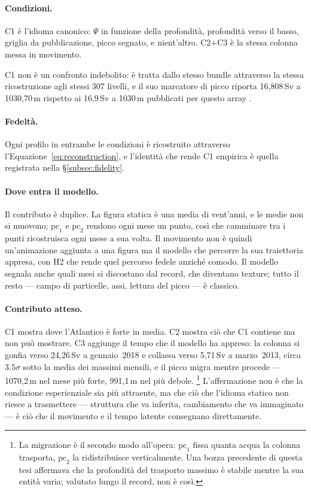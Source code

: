 \paragraph{Condizioni.} C1 è l'idioma canonico: $\Psi$ in funzione della profondità, profondità verso il basso, griglia da pubblicazione, picco segnato, e nient'altro. C2+C3 è la stessa colonna messa in movimento.

C1 non è un confronto indebolito: è tratta dallo stesso bundle attraverso la stessa ricostruzione agli stessi 307 livelli, e il suo marcatore di picco riporta 16,808\,Sv a 1030,70\,m rispetto ai 16,9\,Sv a 1030\,m pubblicati per questo array \parencite{smeed2018}.

\paragraph{Fedeltà.} Ogni profilo in entrambe le condizioni è ricostruito attraverso l'Equazione~\ref{eq:reconstruction}, e l'identità che rende C1 empirica è quella registrata nella \S\ref{subsec:fidelity}.

\paragraph{Dove entra il modello.} Il contributo è duplice. La figura statica è una media di vent'anni, e le medie non si muovono; $\mathrm{pc}_1$ e $\mathrm{pc}_2$ rendono ogni mese un punto, così che camminare tra i punti ricostruisca ogni mese a sua volta. Il movimento non è quindi un'animazione aggiunta a una figura ma il modello che percorre la sua traiettoria appresa, con H2 che rende quel percorso fedele anziché comodo. Il modello segnala anche quali mesi si discostano dal record, che diventano texture; tutto il resto --- campo di particelle, assi, lettura del picco --- è classico.

\paragraph{Contributo atteso.} C1 mostra dove l'Atlantico è forte in media. C2 mostra ciò che C1 contiene ma non può mostrare. C3 aggiunge il tempo che il modello ha appreso: la colonna si gonfia verso 24,26\,Sv a gennaio~2018 e collassa verso 5,71\,Sv a marzo~2013, circa $3.5\sigma$ sotto la media dei massimi mensili, e il picco migra mentre procede --- 1070,2\,m nel mese più forte, 991,1\,m nel più debole.
\footnote{La migrazione è il secondo modo all'opera: $\mathrm{pc}_1$ fissa quanta acqua la colonna trasporta, $\mathrm{pc}_2$ la ridistribuisce verticalmente. Una bozza precedente di questa tesi affermava che la profondità del trasporto massimo è stabile mentre la sua entità varia; valutato lungo il record, non è così.} L'affermazione non è che la condizione esperienziale sia più attraente, ma che ciò che l'idioma statico non riesce a trasmettere --- struttura che va inferita, cambiamento che va immaginato --- è ciò che il movimento e il tempo latente consegnano direttamente.

